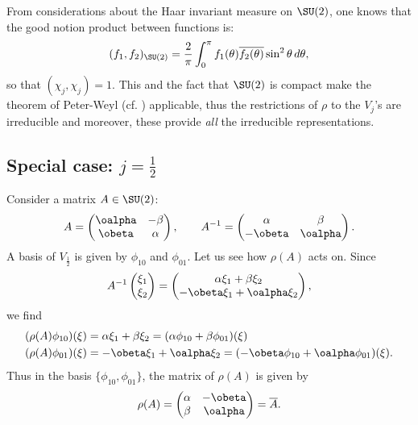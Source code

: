 From considerations about the Haar\quextproj{} invariant measure on $\SU(2)$, one knows that the good notion product between functions is:
\begin{equation}
	(f_1,f_2)_{\SU(2)}=\frac{2}{\pi}\int_0^{\pi}f_1(\theta)\overline{ f_2(\theta) }\sin^2\theta\,d\theta,
\end{equation}
so that $(\chi_j,\chi_j)=1$. This and the fact that $\SU(2)$ is compact make the theorem of Peter-Weyl (cf. \cite{Sternberg}) applicable, thus the restrictions of $\rho$ to the $V_j$'s are irreducible and moreover, these provide \emph{all} the irreducible representations.

\subsection{Special case: \texorpdfstring{$j=\frac{1}{2}$}{j=1/2}}

Consider a matrix $A\in\SU(2)$:
\begin{equation}
	A=\begin{pmatrix}
		\oalpha & -\beta \\
		\obeta  & \alpha
	\end{pmatrix},\qquad
	A^{-1}=\begin{pmatrix}
		\alpha  & \beta   \\
		-\obeta & \oalpha
	\end{pmatrix}.
\end{equation}
A basis of $V_{\frac{1}{2}}$ is given by $\phi_{10}$ and $\phi_{01}$. Let us see how $\rho(A)$ acts on. Since
\[
	A^{-1}\begin{pmatrix}
		\xi_1 \\
		\xi_2
	\end{pmatrix}=
	\begin{pmatrix}
		\alpha\xi_1+\beta\xi_2 \\
		-\obeta\xi_1+\oalpha\xi_2
	\end{pmatrix},
\]
we find
\begin{equation}
	\begin{split}
		(\rho(A)\phi_{10})(\xi)&=\alpha\xi_1+\beta\xi_2=(\alpha\phi_{10}+\beta\phi_{01})(\xi)\\
		(\rho(A)\phi_{01})(\xi)&=-\obeta\xi_1+\oalpha\xi_2=(-\obeta\phi_{10}+\oalpha\phi_{01})(\xi).
	\end{split}
\end{equation}
Thus in the basis $\{\phi_{10},\phi_{01}\}$, the matrix of $\rho(A)$ is given by
\begin{equation}
	\rho(A)=\begin{pmatrix}
		\alpha & -\obeta \\
		\beta  & \oalpha
	\end{pmatrix}=\overline{A}.
\end{equation}

